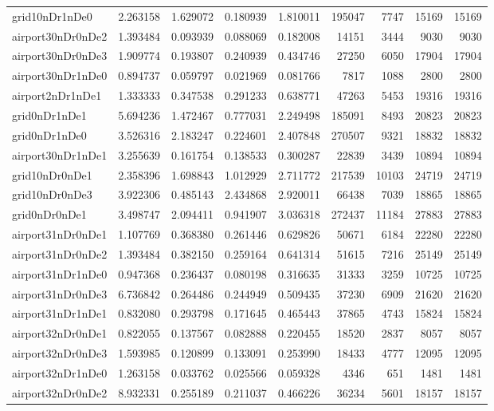 \begin{longtable}{|l|r|r|r|r|r|r|r|r|}
grid10nDr1nDe0 & 2.263158 & 1.629072 & 0.180939 & 1.810011 & 195047 & 7747 & 15169 & 15169 \\
airport30nDr0nDe2 & 1.393484 & 0.093939 & 0.088069 & 0.182008 & 14151 & 3444 & 9030 & 9030 \\
airport30nDr0nDe3 & 1.909774 & 0.193807 & 0.240939 & 0.434746 & 27250 & 6050 & 17904 & 17904 \\
airport30nDr1nDe0 & 0.894737 & 0.059797 & 0.021969 & 0.081766 & 7817 & 1088 & 2800 & 2800 \\
airport2nDr1nDe1 & 1.333333 & 0.347538 & 0.291233 & 0.638771 & 47263 & 5453 & 19316 & 19316 \\
grid0nDr1nDe1 & 5.694236 & 1.472467 & 0.777031 & 2.249498 & 185091 & 8493 & 20823 & 20823 \\
grid0nDr1nDe0 & 3.526316 & 2.183247 & 0.224601 & 2.407848 & 270507 & 9321 & 18832 & 18832 \\
airport30nDr1nDe1 & 3.255639 & 0.161754 & 0.138533 & 0.300287 & 22839 & 3439 & 10894 & 10894 \\
grid10nDr0nDe1 & 2.358396 & 1.698843 & 1.012929 & 2.711772 & 217539 & 10103 & 24719 & 24719 \\
grid10nDr0nDe3 & 3.922306 & 0.485143 & 2.434868 & 2.920011 & 66438 & 7039 & 18865 & 18865 \\
grid0nDr0nDe1 & 3.498747 & 2.094411 & 0.941907 & 3.036318 & 272437 & 11184 & 27883 & 27883 \\
airport31nDr0nDe1 & 1.107769 & 0.368380 & 0.261446 & 0.629826 & 50671 & 6184 & 22280 & 22280 \\
airport31nDr0nDe2 & 1.393484 & 0.382150 & 0.259164 & 0.641314 & 51615 & 7216 & 25149 & 25149 \\
airport31nDr1nDe0 & 0.947368 & 0.236437 & 0.080198 & 0.316635 & 31333 & 3259 & 10725 & 10725 \\
airport31nDr0nDe3 & 6.736842 & 0.264486 & 0.244949 & 0.509435 & 37230 & 6909 & 21620 & 21620 \\
airport31nDr1nDe1 & 0.832080 & 0.293798 & 0.171645 & 0.465443 & 37865 & 4743 & 15824 & 15824 \\
airport32nDr0nDe1 & 0.822055 & 0.137567 & 0.082888 & 0.220455 & 18520 & 2837 & 8057 & 8057 \\
airport32nDr0nDe3 & 1.593985 & 0.120899 & 0.133091 & 0.253990 & 18433 & 4777 & 12095 & 12095 \\
airport32nDr1nDe0 & 1.263158 & 0.033762 & 0.025566 & 0.059328 & 4346 & 651 & 1481 & 1481 \\
airport32nDr0nDe2 & 8.932331 & 0.255189 & 0.211037 & 0.466226 & 36234 & 5601 & 18157 & 18157 \\

\end{longtable}
